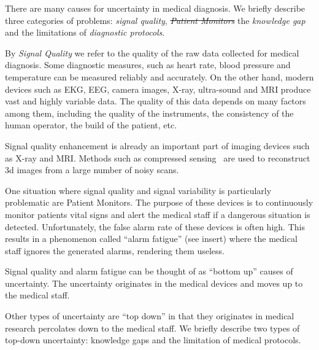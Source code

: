 \documentclass[11pt]{pnas-new}
\begin{document}
\iffalse
It is certainly expected that physicians can achieve a reliable
decision making, probably with sufficient clinical information
\cite{mehta2011agreement} or if only the major information is needed
\cite{atiya2003interobserver}. However, in many cases, the quality of
decision making might be jeopardized due to various reasons, among
which the uncertainty in medicine is non-negligible.
\yoav{I find the previous paragraph unclear and confusing, We should
  talk about it}
\fi

There are many causes for uncertainty in medical diagnosis. We briefly
describe {\color{red}three} categories of problems: {\em signal quality}, \sout{{\em Patient Monitors}} the {\em knowledge gap} and the limitations of {\em
  diagnostic protocols}.


By {\em Signal Quality} we refer to the quality of the raw data
collected for medical diagnosis. Some diagnostic measures, such
as heart rate, blood pressure and temperature can be measured reliably
and accurately. On the other hand, modern
devices such as EKG, EEG, camera images, X-ray, ultra-sound and MRI
produce vast and highly variable data. The quality of this data
depends on many factors among them, including the quality of the instruments, the
consistency of the human operator, the build of the patient, etc.

Signal quality enhancement is already an important part of imaging
devices such as X-ray and MRI. Methods such as compressed
sensing~\cite{} are used to reconstruct 3d images from a large number
of noisy scans.


  One situation where signal quality and signal variability is
particularly problematic are Patient Monitors. The purpose of these
devices is to continuously monitor patients vital signs and alert the
medical staff if a dangerous situation is detected. Unfortunately, the
false alarm rate of these devices is often high. This results in a
phenomenon called ``alarm fatigue'' {\color{red}(see insert)} where the medical staff ignores
the generated alarms, rendering them useless.

Signal quality and alarm fatigue can be thought of as ``bottom up''
causes of uncertainty. The uncertainty originates in the medical
devices and moves up to the medical staff.

Other types of uncertainty are ``top down'' in that they originates in medical research percolates down to the medical staff. We briefly
describe two types of top-down uncertainty: knowledge gaps and the
limitation of medical protocols.
\end{document}
